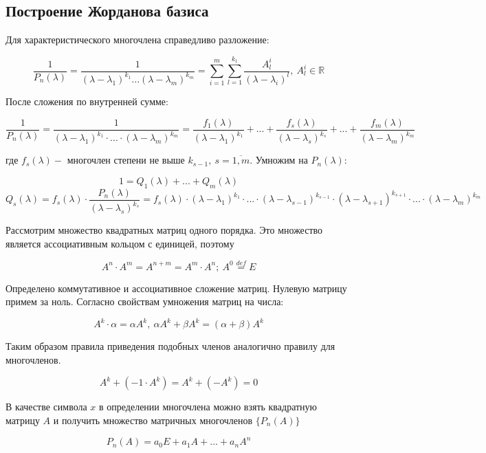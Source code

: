 \documentclass[a4paper, 12pt]{article}
\begin{document}
\subsection{Построение Жорданова базиса}

Для характеристического многочлена справедливо разложение:

\[\frac{1}{P_n(\lambda)} = \frac{1}{(\lambda - \lambda_1)^{k_1}...(\lambda - \lambda_m)^{k_m}} = \sum\limits_{i = 1}^{m}{\sum\limits_{l=1}^{k_1}{\frac{A^i_l}{(\lambda - \lambda_i)^l}}},~ A^i_l \in \mathbb {R}\]

После сложения по внутренней сумме:

\[\frac{1}{P_n(\lambda)} = \frac{1}{(\lambda - \lambda_1)^{k_1} \cdot ...\cdot (\lambda - \lambda_m)^{k_m}} = \frac{f_1(\lambda)}{(\lambda-\lambda_1)^{k_1}} + ... + \frac{f_s(\lambda)}{(\lambda-\lambda_s)^{k_s}} + ... + \frac{f_m(\lambda)}{(\lambda-\lambda_m)^{k_m}}\]

где $f_s(\lambda) - $ многочлен степени не выше $k_{s-1},~ s = \overline{1,m}$. Умножим на $P_n(\lambda):$

\[1 = Q_1(\lambda) + ... + Q_m(\lambda)\]
\begin{equation}
Q_s(\lambda) = f_s(\lambda)\cdot\frac{P_n(\lambda)}{(\lambda - \lambda_s)^{k_s}} = f_s(\lambda)\cdot(\lambda - \lambda_1)^{k_1} \cdot ... \cdot (\lambda - \lambda_{s-1})^{k_{s-1}} \cdot (\lambda - \lambda_{s+1})^{k_{s+1}} \cdot ... \cdot (\lambda - \lambda_{m})^{k_{m}}
\label{20_1}
\end{equation}


Рассмотрим множество квадратных матриц одного порядка. Это множество является ассоциативным кольцом с единицей, поэтому

\[A^n \cdot A^m = A^{n+m} = A^m \cdot A^n;~ A^0 \stackrel{def}{=} E\]

Определено коммутативное и ассоциативное сложение матриц. Нулевую матрицу примем за ноль. Согласно свойствам умножения матриц на числа:

\[A^k \cdot \alpha = \alpha A^k,~ \alpha A^k + \beta A^k = (\alpha + \beta) A^k\]

Таким образом правила приведения подобных членов аналогично правилу для многочленов.

\[A^k + (-1 \cdot A^k) = A^k + (-A^k) = 0\]

В качестве символа $x$ в определении многочлена можно взять квадратную матрицу $A$ и получить множество матричных многочленов $\{P_n(A)\}$

\[P_n(A) = a_0 E + a_1 A + ... + a_n A^n\]
\end{document}
